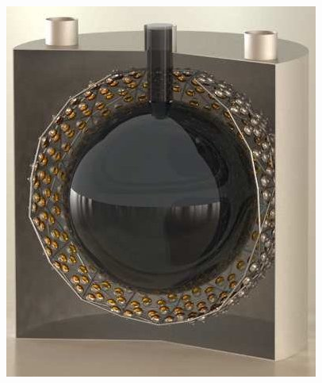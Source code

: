 \documentclass{beamer}
\begin{document}
\begin{frame}
\begin{columns}
\begin{figure}
    \includegraphics[width=0.6\linewidth]{img/DetectoratJinping.jpg}
\end{figure}
\end{columns}
\end{frame}
\end{document}
